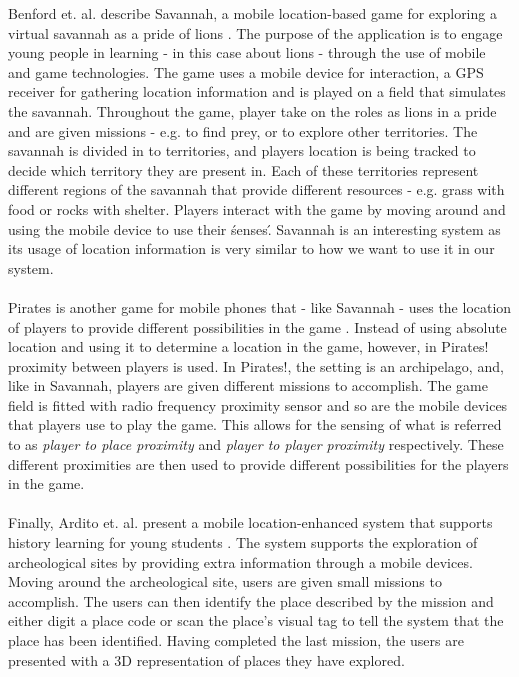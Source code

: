Benford et. al. describe Savannah, a mobile location-based game for exploring a virtual savannah as a pride of lions \cite{Benford_Rowland_Hull_Reid_Morrison_Facer_Clayton_2004}. The purpose of the application is to engage young people in learning - in this case about lions - through the use of mobile and game technologies. The game uses a mobile device for interaction, a GPS receiver for gathering location information and is played on a field that simulates the savannah. Throughout the game, player take on the roles as lions in a pride and are given missions - e.g. to find prey, or to explore other territories. The savannah is divided in to territories, and players location is being tracked to decide which territory they are present in. Each of these territories represent different regions of the savannah that provide different resources - e.g. grass with food or rocks with shelter. Players interact with the game by moving around and using the mobile device to use their \'senses\'. Savannah is an interesting system as its usage of location information is very similar to how we want to use it in our system.
\\\\
Pirates is another game for mobile phones that - like Savannah - uses the location of players to provide different possibilities in the game \cite{Falk:2001:PPI:634067.634140}. Instead of using absolute location and using it to determine a location in the game, however, in Pirates! proximity between players is used. In Pirates!, the setting is an archipelago, and, like in Savannah, players are given different missions to accomplish. The game field is fitted with radio frequency proximity sensor and so are the mobile devices that players use to play the game. This allows for the sensing of what is referred to as \emph{player to place proximity} and \emph{player to player proximity} respectively. These different proximities are then used to provide different possibilities for the players in the game.
\\\\
Finally, Ardito et. al. present a mobile location-enhanced system that supports history learning for young students \cite{4351331}. The system supports the exploration of archeological sites by providing extra information through a mobile devices. Moving around the archeological site, users are given small missions to accomplish. The users can then identify the place described by the mission and either digit a place code or scan the place's visual tag to tell the system that the place has been identified. Having completed the last mission, the users are presented with a 3D representation of places they have explored. 
